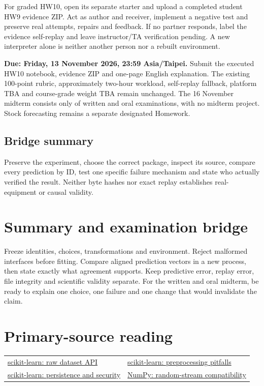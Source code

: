 For graded HW10, open its separate starter and upload a completed student HW9 evidence ZIP. Act as author and receiver, implement a negative test and preserve real attempts, repairs and feedback. If no partner responds, label the evidence self-replay and leave instructor/TA verification pending. A new interpreter alone is neither another person nor a rebuilt environment.

\textbf{Due: Friday, 13 November 2026, 23:59 Asia/Taipei.} Submit the executed HW10 notebook, evidence ZIP and one-page English explanation. The existing 100-point rubric, approximately two-hour workload, self-replay fallback, platform TBA and course-grade weight TBA remain unchanged. The 16 November midterm consists only of written and oral examinations, with no midterm project. Stock forecasting remains a separate designated Homework.

\subsection{Bridge summary}
Preserve the experiment, choose the correct package, inspect its source, compare every prediction by ID, test one specific failure mechanism and state who actually verified the result. Neither byte hashes nor exact replay establishes real-equipment or causal validity.


\section{Summary and examination bridge}
Freeze identities, choices, transformations and environment. Reject malformed interfaces before fitting. Compare aligned prediction vectors in a new process, then state exactly what agreement supports. Keep predictive error, replay error, file integrity and scientific validity separate. For the written and oral midterm, be ready to explain one choice, one failure and one change that would invalidate the claim.

\section{Primary-source reading}
{\small\noindent\begin{tabular}{p{.46\linewidth}p{.46\linewidth}}
\href{https://scikit-learn.org/stable/modules/generated/sklearn.datasets.load_diabetes.html}{scikit-learn: raw dataset API} &
\href{https://scikit-learn.org/stable/common_pitfalls.html}{scikit-learn: preprocessing pitfalls}\\[4pt]
\href{https://scikit-learn.org/stable/model_persistence.html}{scikit-learn: persistence and security} &
\href{https://numpy.org/doc/stable/reference/random/compatibility.html}{NumPy: random-stream compatibility}
\end{tabular}}

